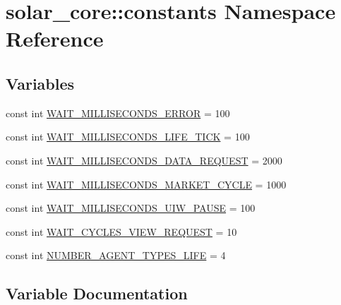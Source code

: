 \hypertarget{namespacesolar__core_1_1constants}{}\section{solar\+\_\+core\+:\+:constants Namespace Reference}
\label{namespacesolar__core_1_1constants}
\subsection*{Variables}
\begin{DoxyCompactItemize}
\item 
const int \hyperlink{namespacesolar__core_1_1constants_a4cddd8d733f9237d6fb56197354fed46}{W\+A\+I\+T\+\_\+\+M\+I\+L\+L\+I\+S\+E\+C\+O\+N\+D\+S\+\_\+\+E\+R\+R\+O\+R} = 100
\item 
const int \hyperlink{namespacesolar__core_1_1constants_ab90981a98985a16f6e239808f36186d7}{W\+A\+I\+T\+\_\+\+M\+I\+L\+L\+I\+S\+E\+C\+O\+N\+D\+S\+\_\+\+L\+I\+F\+E\+\_\+\+T\+I\+C\+K} = 100
\item 
const int \hyperlink{namespacesolar__core_1_1constants_a88d556c323e6871de3313428289b6cb6}{W\+A\+I\+T\+\_\+\+M\+I\+L\+L\+I\+S\+E\+C\+O\+N\+D\+S\+\_\+\+D\+A\+T\+A\+\_\+\+R\+E\+Q\+U\+E\+S\+T} = 2000
\item 
const int \hyperlink{namespacesolar__core_1_1constants_ab3dddf011f92328166c5f93e3951107e}{W\+A\+I\+T\+\_\+\+M\+I\+L\+L\+I\+S\+E\+C\+O\+N\+D\+S\+\_\+\+M\+A\+R\+K\+E\+T\+\_\+\+C\+Y\+C\+L\+E} = 1000
\item 
const int \hyperlink{namespacesolar__core_1_1constants_abebba44aef8bbf544a330b8b20229320}{W\+A\+I\+T\+\_\+\+M\+I\+L\+L\+I\+S\+E\+C\+O\+N\+D\+S\+\_\+\+U\+I\+W\+\_\+\+P\+A\+U\+S\+E} = 100
\item 
const int \hyperlink{namespacesolar__core_1_1constants_ae4d0a481c94f57be3e97f1c8463e631a}{W\+A\+I\+T\+\_\+\+C\+Y\+C\+L\+E\+S\+\_\+\+V\+I\+E\+W\+\_\+\+R\+E\+Q\+U\+E\+S\+T} = 10
\item 
const int \hyperlink{namespacesolar__core_1_1constants_a2ec52da705235aa418b0def4e509ef81}{N\+U\+M\+B\+E\+R\+\_\+\+A\+G\+E\+N\+T\+\_\+\+T\+Y\+P\+E\+S\+\_\+\+L\+I\+F\+E} = 4
\end{DoxyCompactItemize}


\subsection{Variable Documentation}
\hypertarget{namespacesolar__core_1_1constants_a2ec52da705235aa418b0def4e509ef81}{}
